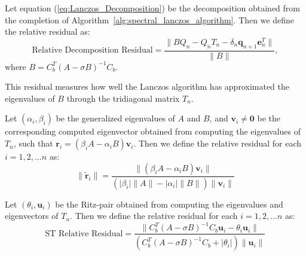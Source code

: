 \begin{definition}\label{def:DecompositionResidual}
	Let equation (\ref{eq:Lanczos_Decomposition}) be the decomposition obtained from the completion of Algorithm~\ref{alg:spectral_lanczos_algorithm}. Then we define the relative residual as:
	\begin{equation}\label{eq:DecompositionResidual}
		\text{Relative Decomposition Residual} = \frac{\|BQ_n - Q_nT_n - \delta_{n}\mathbf{q}_{n+1}\mathbf{e}_n^T\|}{\|B\|},
	\end{equation}
	where $B = C_b^T (A-\sigma B)^{-1} C_b $. 
\end{definition}
This residual measures how well the Lanczos algorithm has approximated the eigenvalues of $B$ through the tridiagonal matrix $T_n$.

\begin{definition}\label{def:GeneralizedRelativeResidual}
	Let $(\alpha_i, \beta_i)$ be the generalized eigenvalues of $A$ and $B$, and $\mathbf{v}_i \neq \mathbf{0}$ be the corresponding computed eigenvector obtained from computing the eigenvalues of $T_n$, such that $\mathbf{r}_i = (\beta_i A - \alpha_i B)\mathbf{v}_i$. Then we define the relative residual for each $i = 1, 2, \ldots n$ as:
	\begin{equation}\label{eq:GeneralizedResidual}
		\|\tilde{\mathbf{r}}_i\| = \frac{\| (\beta_i A - \alpha_i B)\mathbf{v}_i \| }{(\lvert \beta_i \rvert \|A\| - \lvert \alpha_i \rvert \|B\|)\|\mathbf{v}_i\| }
	\end{equation}
\end{definition}

\begin{definition}\label{def:SpectralTransformedResidual}
	Let $(\theta_i, \mathbf{u}_i)$ be the Ritz-pair obtained from computing the eigenvalues and eigenvectors of $T_n$. Then we define the relative residual for each $i = 1, 2, \ldots n$ as:
	\begin{equation}\label{eq:STResidual}
		\text{ST Relative Residual} = \frac{\| C_b^T(A - \sigma B)^{-1}C_b \mathbf{u}_i - \theta_i \mathbf{u}_i \| }{( C_b^T(A - \sigma B)^{-1}C_b + \lvert \theta_i \rvert)\|\mathbf{u}_i\| }
	\end{equation}
\end{definition}

